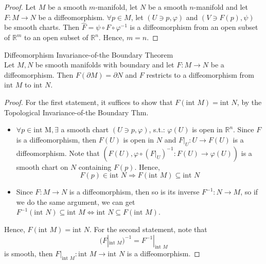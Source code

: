 \begin{proof}
    Let $M$ be a smooth $m$-manifold, let $N$ be a smooth $n$-manifold and let $F:M\to N$ be a diffeomorphism. $\forall p\in M$, let $(U\ni p,\varphi)$ and $(V\ni F(p), \psi)$ be smooth charts. Then $\widehat{F}= \psi \circ F\circ \varphi^{-1}$ is a diffeomorphism from an open subset of $\mathbb{R}^m$ to an open subset of $\mathbb{R}^n$. Hence, $m=n$.
\end{proof}

\begin{theorem}{Diffeomorphism Invariance-of-the Boundary Theorem}\\
Let $M,N$ be smooth manifolds with boundary and let $F:M\to N$ be a diffeomorphism. Then $F(\partial M)= \partial N$ and $F$ restricts to a diffeomorphism from $\text{int }M$ to $\text{int }N$.
\end{theorem}

\begin{proof}
    For the first statement, it suffices to show that $F(\text{int }M)= \text{int }N$, by the Topological Invariance-of-the Boundary Thm.
    \begin{itemize}
        \item $\forall p\in \text{int M}, \exists$ a smooth chart $(U\ni p, \varphi)$, s.t.: $\varphi(U)$ is open in $\mathbb{R}^n$. Since $F$ is a diffeomorphism, then $F(U)$ is open in $N$ and $F|_{U}: U\to F(U)$ is a diffeomorphism. Note that $(F(U), \varphi\circ (F|_U)^{-1}: F(U)\to \varphi(U))$ is a smooth chart on $N$ containing $F(p)$. Hence, 
        \[
        F(p) \in \text{int }N \Rightarrow F(\text{int }M) \subseteq \text{int }N
        \]
        \item Since $F:M\to N$ is a diffeomorphism, then so is its inverse $F^{-1} :N\to M$, so if we do the same argument, we can get $F^{-1}(\text{int }N) \subseteq \text{int }M \Leftrightarrow \text{int }N \subseteq F(\text{int }M)$.
    \end{itemize}
    Hence, $F(\text{int }M)=\text{int }N$. For the second statement, note that
    \[
    (F|_{\text{int }M})^{-1} = F^{-1}|_{\text{int }M}
    \]
    is smooth, then $F|_{\text{int }M}: \text{int }M\to \text{int }N$ is a diffeomorphism.
\end{proof}